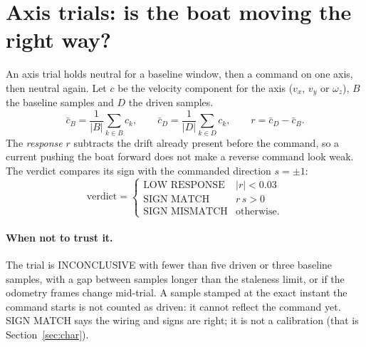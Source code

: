 \section{Axis trials: is the boat moving the right way?}
\label{sec:trial}

An axis trial holds neutral for a baseline window, then a command on one axis,
then neutral again. Let $c$ be the velocity component for the axis
($v_x$, $v_y$ or $\omega_z$), $B$ the baseline samples and $D$ the driven samples.
\[
  \bar c_B = \frac1{|B|}\sum_{k\in B} c_k,\qquad
  \bar c_D = \frac1{|D|}\sum_{k\in D} c_k,\qquad
  r = \bar c_D - \bar c_B .
\]
The \emph{response} $r$ subtracts the drift already present before the command,
so a current pushing the boat forward does not make a reverse command look
weak. The verdict compares its sign with the commanded direction $s=\pm1$:
\[
  \text{verdict} = \begin{cases}
    \text{LOW RESPONSE} & |r| < 0.03\\
    \text{SIGN MATCH} & r\,s > 0\\
    \text{SIGN MISMATCH} & \text{otherwise.}
  \end{cases}
\]
\paragraph{When not to trust it.} The trial is INCONCLUSIVE with fewer than five
driven or three baseline samples, with a gap between samples longer than the
staleness limit, or if the odometry frames change mid-trial. A sample stamped at
the exact instant the command starts is not counted as driven: it cannot reflect
the command yet. SIGN MATCH says the wiring and signs are right; it is not a
calibration (that is Section~\ref{sec:char}).
